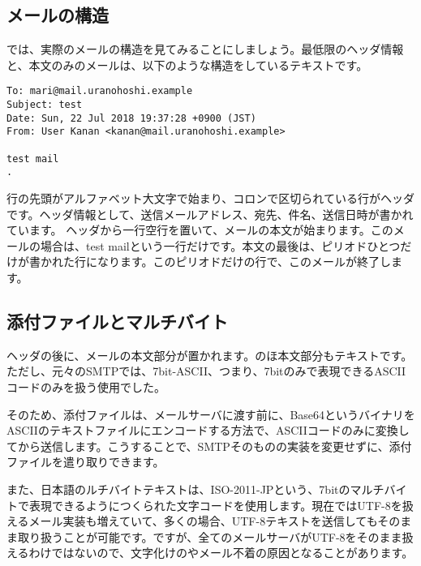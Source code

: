 \subsection{メールの構造}
では、実際のメールの構造を見てみることにしましょう。最低限のヘッダ情報と、本文のみのメールは、以下のような構造をしているテキストです。

\begin{verbatim}
To: mari@mail.uranohoshi.example
Subject: test
Date: Sun, 22 Jul 2018 19:37:28 +0900 (JST)
From: User Kanan <kanan@mail.uranohoshi.example>

test mail
.
\end{verbatim}

行の先頭がアルファベット大文字で始まり、コロンで区切られている行がヘッダです。ヘッダ情報として、送信メールアドレス、宛先、件名、送信日時が書かれています。
ヘッダから一行空行を置いて、メールの本文が始まります。このメールの場合は、test mailという一行だけです。本文の最後は、ピリオドひとつだけが書かれた行になります。このピリオドだけの行で、このメールが終了します。




\subsection{添付ファイルとマルチバイト}
ヘッダの後に、メールの本文部分が置かれます。のほ本文部分もテキストです。ただし、元々のSMTPでは、7bit-ASCII、つまり、7bitのみで表現できるASCIIコードのみを扱う使用でした。

そのため、添付ファイルは、メールサーバに渡す前に、Base64というバイナリをASCIIのテキストファイルにエンコードする方法で、ASCIIコードのみに変換してから送信します。こうすることで、SMTPそのものの実装を変更せずに、添付ファイルを遣り取りできます。

また、日本語のルチバイトテキストは、ISO-2011-JPという、7bitのマルチバイトで表現できるようにつくられた文字コードを使用します。現在ではUTF-8を扱えるメール実装も増えていて、多くの場合、UTF-8テキストを送信してもそのまま取り扱うことが可能です。ですが、全てのメールサーバがUTF-8をそのまま扱えるわけではないので、文字化けのやメール不着の原因となることがあります。

